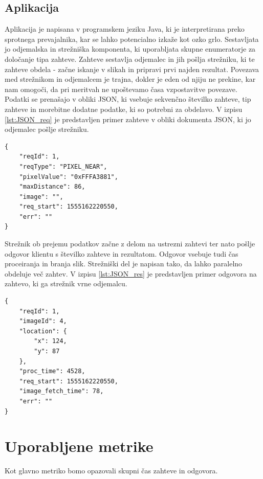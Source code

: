 \subsection{Aplikacija}

Aplikacija je napisana v programskem jeziku Java, ki je interpretirana preko sprotnega prevajalnika, kar se lahko potencialno izkaže kot ozko grlo. Sestavljata jo odjemalska in strežniška komponenta, ki uporabljata skupne enumeratorje za določanje tipa zahteve. Zahteve sestavlja odjemalec in jih pošlja strežniku, ki te zahteve obdela - začne iskanje v slikah in pripravi prvi najden rezultat. Povezava med strežnikom in odjemalcem je trajna, dokler je eden od njiju ne prekine, kar nam omogoči, da pri meritvah ne upoštevamo časa vzpostavitve povezave. Podatki se prenašajo v obliki JSON, ki vsebuje sekvenčno številko zahteve, tip zahteve in morebitne dodatne podatke, ki so potrebni za obdelavo. V izpisu \ref{lst:JSON_req} je predstavljen primer zahteve v obliki dokumenta JSON, ki jo odjemalec pošlje strežniku.

\begin{lstlisting}[caption={Primer JSON zahteve.},label={lst:JSON_req}]
{
	"reqId": 1,
	"reqType": "PIXEL_NEAR",
	"pixelValue": "0xFFFA3881",
	"maxDistance": 86,
	"image": "",
	"req_start": 1555162220550,
	"err": ""
}
\end{lstlisting}

Strežnik ob prejemu podatkov začne z delom na ustrezni zahtevi ter nato pošlje odgovor klientu s številko zahteve in rezultatom. Odgovor vsebuje tudi čas proceiranja in branja slik. Strežniški del je napisan tako, da lahko paralelno obdeluje več zahtev. V izpisu  \ref{lst:JSON_res} je predstavljen primer odgovora na zahtevo, ki ga strežnik vrne odjemalcu.

\begin{lstlisting}[caption={Primer JSON odgovora.},label={lst:JSON_res}]
{
	"reqId": 1,
	"imageId": 4,
	"location": {
		"x": 124,
		"y": 87	
	},
	"proc_time": 4528,
	"req_start": 1555162220550,
	"image_fetch_time": 78,
	"err": ""
}
\end{lstlisting}

\section{Uporabljene metrike}

Kot glavno metriko bomo opazovali skupni čas zahteve in odgovora.

